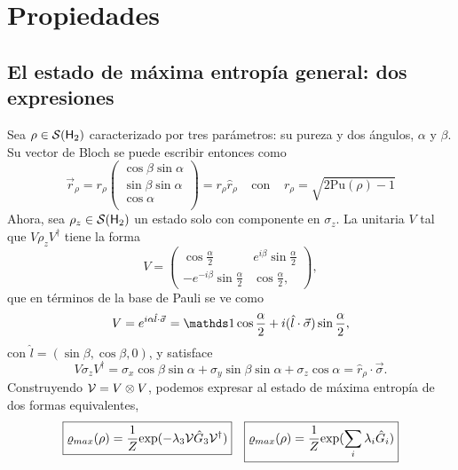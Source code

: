 \section{Propiedades}



\subsection{El estado de máxima entropía general: dos expresiones}
Sea $\rho\in\mathcal{S}({\sf H}_{2})$ caracterizado por tres parámetros: su pureza y dos ángulos, $\alpha$ y $\beta$. Su vector de Bloch se puede escribir entonces como
\begin{equation}
  \vec{r}_{\rho}=r_{\rho}\begin{pmatrix}
    \cos{\beta}\sin{\alpha}\\
    \sin{\beta}\sin{\alpha}\\
    \cos{\alpha}\\
  \end{pmatrix}=r_{\rho}\hat{r}_{\rho} \; \; \; \; \text{con} \; \; \; \; r_{\rho}=\sqrt{2\text{Pu}(\rho)-1}
\end{equation}
Ahora, sea $\rho_{z}\in\mathcal{S}({\sf H}_{2})$ un estado solo con componente en $\sigma_{z}$. La unitaria $V$ tal que $V\rho_{z} V^{\dag}$ tiene la forma
\begin{equation}
  V=
  \begin{pmatrix}
      \cos{\frac{\alpha}{2}} & e^{i\beta}\sin{\frac{\alpha}{2}}\\
      -e^{-i\beta}\sin{\frac{\alpha}{2}}& \cos{\frac{\alpha}{2}},
  \end{pmatrix},
\end{equation}
que en términos de la base de Pauli se ve como
\begin{equation}
  V=e^{i\alpha \hat{l}\cdot \vec{\sigma}}=\Id \cos{\frac{\alpha}{2}}+i(\hat{l}\cdot \vec{\sigma})\sin{\frac{\alpha}{2}},
\end{equation}
con $\hat{l}=(\sin{\beta},\cos{\beta},0)$, y satisface
\begin{equation}\label{eq:VsigmazV}
  V\sigma_{z}V^{\dag}=\sigma_{x}\cos{\beta}\sin{\alpha}+\sigma_{y}\sin{\beta}\sin{\alpha}+\sigma_{z}\cos{\alpha}=\hat{r}_{\rho}\cdot\vec{\sigma}.
\end{equation}
Construyendo $\mathcal{V}=V\otimes V$, podemos expresar al estado de máxima entropía de dos formas equivalentes,
\begin{align}\label{eq:MaxEntTwoExpr}
  \boxed{\varrho_{max}(\rho)=\frac{1}{Z}\text{exp}(-\lambda_{3}\mathcal{V}\hat{G}_{3}\mathcal{V}^{\dag})} && \boxed{\varrho_{max}(\rho)=\frac{1}{Z}\text{exp}(\sum_{i}\lambda_{i}\hat{G}_{i})}
\end{align}

